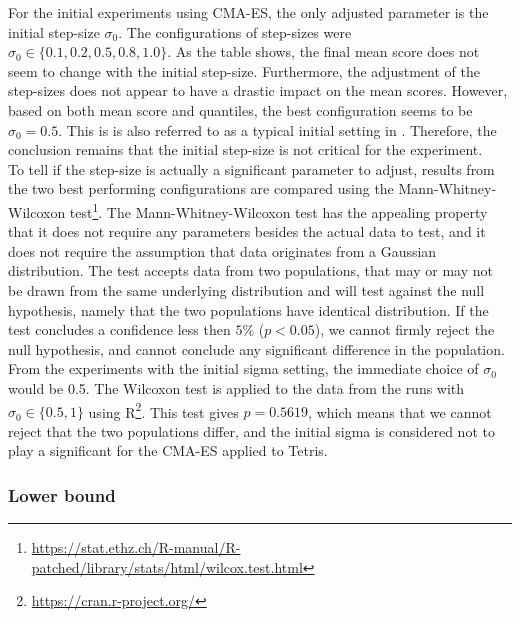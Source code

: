 
For the initial experiments using CMA-ES, 
the only adjusted parameter is the initial 
step-size $\sigma_0$. The configurations of step-sizes were 
$\sigma_0 \in \{0.1, 0.2, 0.5, 0.8, 1.0\}$. As the table shows,
the final mean score does not seem to change with the initial step-size.
Furthermore, the adjustment of the step-sizes does not appear to 
have a drastic impact on the mean scores. However, based on both mean score and
quantiles, the best configuration seems to be $\sigma_0 = 0.5$. This is 
is also referred to as a typical initial setting in \citep{boumaza2009}.
Therefore, the conclusion remains that the initial step-size is not critical 
for the experiment.\\

To tell if the step-size is actually a significant parameter to adjust, results from 
the two best performing configurations are compared using the Mann-Whitney-Wilcoxon test\footnote{\url{https://stat.ethz.ch/R-manual/R-patched/library/stats/html/wilcox.test.html}}.
The Mann-Whitney-Wilcoxon test has the appealing property that it does not require any parameters
besides the actual data to test, and it does not require the assumption that data originates 
from a Gaussian distribution. The test accepts data from two populations, that may or may not 
be drawn from the same underlying distribution and will test against the null hypothesis, 
namely that the two populations have identical distribution. If the test concludes a 
confidence less then $5\%$ ($p < 0.05$), we cannot firmly reject the null hypothesis, 
and cannot conclude any significant difference in the population. From the experiments
with the initial sigma setting, the immediate choice of $\sigma_0$ would be 0.5.
The Wilcoxon test is applied to the data from the runs with $\sigma_0 \in \{0.5, 1\}$
using R\footnote{\url{https://cran.r-project.org/}}.
This test gives $p=0.5619$, which means that we cannot reject that the two 
populations differ, and the initial sigma is considered not to play a significant 
for the CMA-ES applied to Tetris.


\subsubsection{Lower bound}

